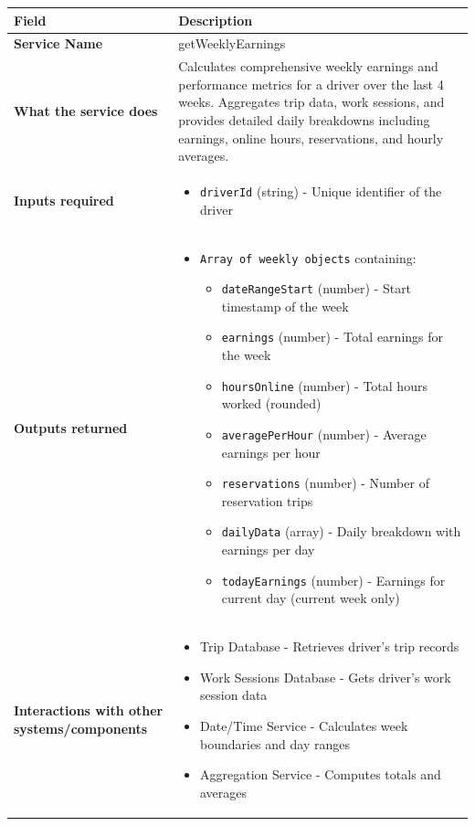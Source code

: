 \documentclass[11pt,a4paper]{article}
\begin{document}
\begin{longtable}{|p{4cm}|p{12cm}|}
\hline
\textbf{Field} & \textbf{Description} \\
\hline
\textbf{Service Name} & getWeeklyEarnings \\
\hline
\textbf{What the service does} & 
Calculates comprehensive weekly earnings and performance metrics for a driver over the last 4 weeks. Aggregates trip data, work sessions, and provides detailed daily breakdowns including earnings, online hours, reservations, and hourly averages. \\
\hline
\textbf{Inputs required} & 
\begin{itemize}[nosep]
\item \texttt{driverId} (string) - Unique identifier of the driver
\end{itemize} \\
\hline
\textbf{Outputs returned} & 
\begin{itemize}[nosep]
\item \texttt{Array of weekly objects} containing:
  \begin{itemize}[nosep]
  \item \texttt{dateRangeStart} (number) - Start timestamp of the week
  \item \texttt{earnings} (number) - Total earnings for the week
  \item \texttt{hoursOnline} (number) - Total hours worked (rounded)
  \item \texttt{averagePerHour} (number) - Average earnings per hour
  \item \texttt{reservations} (number) - Number of reservation trips
  \item \texttt{dailyData} (array) - Daily breakdown with earnings per day
  \item \texttt{todayEarnings} (number) - Earnings for current day (current week only)
  \end{itemize}
\end{itemize} \\
\hline
\textbf{Interactions with other systems/components} & 
\begin{itemize}[nosep]
\item Trip Database - Retrieves driver's trip records
\item Work Sessions Database - Gets driver's work session data
\item Date/Time Service - Calculates week boundaries and day ranges
\item Aggregation Service - Computes totals and averages

\end{itemize}
\end{longtable}
\end{document}
